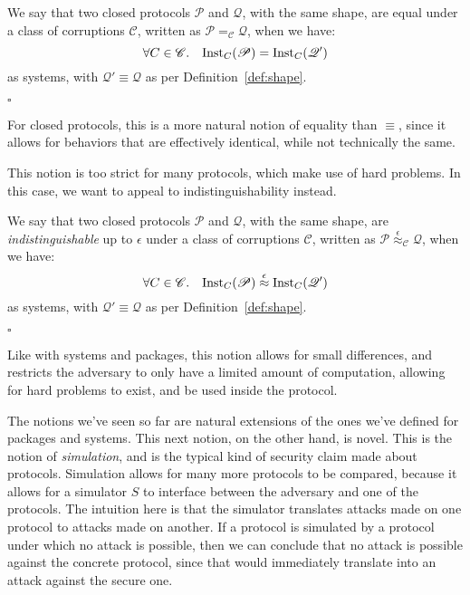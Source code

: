 \begin{definition}
  We say that two closed protocols $\mathscr{P}$ and $\mathscr{Q}$,
  with the same shape,
  are equal under a class of corruptions $\mathscr{C}$,
  written as $\mathscr{P} =_{\mathscr{C}} \mathscr{Q}$, when we have:
  $$
  \forall C \in \mathscr{C}.\quad \text{Inst}_C(\mathscr{P}) = \text{Inst}_C(\mathscr{Q}')
  $$
  as systems, with $\mathscr{Q}' \equiv \mathscr{Q}$ as per 
  Definition~\ref{def:shape}.

  $\square$

\end{definition}

For closed protocols, this is a more natural notion of equality
than $\equiv$, since it allows for behaviors
that are effectively identical, while not technically the same.

This notion is too strict for many protocols, which make
use of hard problems.
In this case, we want to appeal to indistinguishability instead.

\begin{definition}[Indistinguishability]
  We say that two closed protocols $\mathscr{P}$ and $\mathscr{Q}$,
  with the same shape,
  are \emph{indistinguishable} up to $\epsilon$ under a class of corruptions $\mathscr{C}$,
  written as $\mathscr{P} \overset{\epsilon}{\approx}_{\mathscr{C}} \mathscr{Q}$, when we have:
  $$
  \forall C \in \mathscr{C}.\quad \text{Inst}_C(\mathscr{P}) \overset{\epsilon}{\approx} \text{Inst}_C(\mathscr{Q}')
  $$
  as systems, with $\mathscr{Q}' \equiv \mathscr{Q}$ as per 
  Definition~\ref{def:shape}.

  $\square$

\end{definition}

Like with systems and packages, this notion allows for
small differences, and restricts the adversary to only
have a limited amount of computation, allowing for hard
problems to exist, and be used inside the protocol.

The notions we've seen so far are natural extensions of the ones
we've defined for packages and systems.
This next notion, on the other hand, is novel.
This is the notion of \emph{simulation},
and is the typical kind of security claim made about protocols.
Simulation allows for many more protocols to be compared,
because it allows for a simulator $S$ to interface
between the adversary and one of the protocols.
The intuition here is that the simulator translates
attacks made on one protocol to attacks made on another.
If a protocol is simulated by a protocol under which
no attack is possible, then we can conclude that no
attack is possible against the concrete protocol,
since that would immediately translate into an attack against
the secure one.

